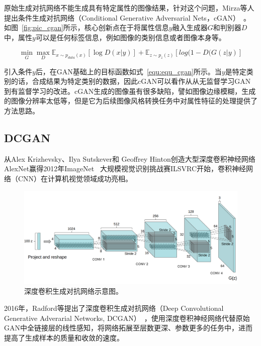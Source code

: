 原始生成对抗网络不能生成具有特定属性的图像结果，针对这个问题，Mirza等人提出条件生成对抗网络（Conditional Generative Adversarial Nets，cGAN）~\citep{mirza2014conditional}。如图~\ref{fig:pic_cgan}所示，核心创新点在于将属性信息$y$融入生成器$G$和判别器$D$中，属性$y$可以是任何标签信息，例如图像的类别信息或者图像本身等。

\begin{equation}
\label{equ:equ_cgan}
\mathop{min} \limits_{G} \mathop{max} \limits_{D} \mathbb{E}_{x \sim p_{data}(x)}[\log D(x|y)] + \mathbb{E}_{z \sim p_{z}(z)}[log(1-D(G(z|y)]
\end{equation}

引入条件$y$后，在GAN基础上的目标函数如式~\ref{equ:equ_cgan}所示。当$y$是特定类别的话，合成结果为特定类别的数据，因此cGAN可以看作从从无监督学习GAN到有监督学习的改进。cGAN生成的图像虽有很多缺陷，譬如图像边缘模糊，生成的图像分辨率太低等，但是它为后续图像风格转换任务中对属性特征的处理提供了方法思路。


\subsection{DCGAN}
从Alex Krizhevsky、Ilya Sutskever和 Geoffrey Hinton创造大型深度卷积神经网络AlexNet\cite{krizhevsky2017imagenet}赢得2012年ImageNet~\cite{deng2009imagenet} 大规模视觉识别挑战赛ILSVRC开始，卷积神经网络（CNN）在计算机视觉领域成功亮相。

\begin{figure}[ht]
    \centering
	\includegraphics[width=\textwidth]{figures/DCGAN.png}
	\caption{深度卷积生成对抗网络示意图。}
	\label{fig:pic_dcgan}
\end{figure}

2016年，Radford等提出了深度卷积生成对抗网络（Deep Convolutional Generative Adverarial Networks, DCGAN）~\cite{radford2015unsupervised}，使用深度卷积神经网络代替原始GAN中全链接层的线性感知，将网络拓展至层数更深、参数更多的任务中，进而提高了生成样本的质量和收敛的速度。

